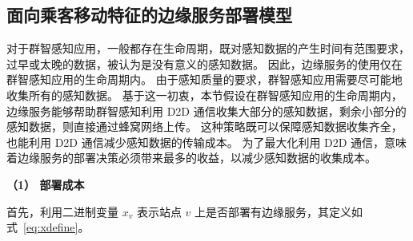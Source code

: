 \begin{table}[!t]
\begin{tabular}{|c|p{10.5cm}|}
  \end{tabular}
\end{table}

\subsection{面向乘客移动特征的边缘服务部署模型}

对于群智感知应用，一般都存在生命周期，既对感知数据的产生时间有范围要求，过早或太晚的数据，被认为是没有意义的感知数据。
因此，边缘服务的使用仅在群智感知应用的生命周期内。
由于感知质量的要求，群智感知应用需要尽可能地收集所有的感知数据。
基于这一初衷，本节假设在群智感知应用的生命周期内，边缘服务能够帮助群智感知利用 D2D 通信收集大部分的感知数据，剩余小部分的感知数据，则直接通过蜂窝网络上传。
这种策略既可以保障感知数据收集齐全，也能利用 D2D 通信减少感知数据的传输成本。
为了最大化利用 D2D 通信，意味着边缘服务的部署决策必须带来最多的收益，以减少感知数据的收集成本。

\textbf{（1） 部署成本}

首先，利用二进制变量 $x_v$ 表示站点 $v$ 上是否部署有边缘服务，其定义如式~\eqref{eq:xdefine}。

